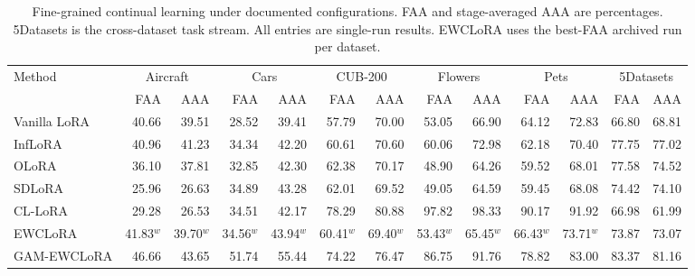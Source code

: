 \begin{table}[t]
\centering
\caption{Fine-grained continual learning under documented configurations. FAA and stage-averaged AAA are percentages. 5Datasets is the cross-dataset task stream. All entries are single-run results. EWCLoRA uses the best-FAA archived run per dataset.}
\label{tab:exp_fine}
\scriptsize\setlength{\tabcolsep}{2.2pt}\renewcommand{\arraystretch}{1.08}
\begin{tabular*}{\linewidth}{@{\extracolsep{\fill}}l*{12}{r}@{}}
\toprule
Method & \multicolumn{2}{c}{Aircraft} & \multicolumn{2}{c}{Cars} & \multicolumn{2}{c}{CUB-200} & \multicolumn{2}{c}{Flowers} & \multicolumn{2}{c}{Pets} & \multicolumn{2}{c}{5Datasets}\\
\cmidrule(lr){2-3}\cmidrule(lr){4-5}\cmidrule(lr){6-7}\cmidrule(lr){8-9}\cmidrule(lr){10-11}\cmidrule(lr){12-13}
 & FAA & AAA & FAA & AAA & FAA & AAA & FAA & AAA & FAA & AAA & FAA & AAA\\\midrule
Vanilla LoRA & 40.66 & 39.51 & 28.52 & 39.41 & 57.79 & 70.00 & 53.05 & 66.90 & 64.12 & 72.83 & 66.80 & 68.81\\
InfLoRA & 40.96 & 41.23 & 34.34 & 42.20 & 60.61 & 70.60 & 60.06 & 72.98 & 62.18 & 70.40 & 77.75 & 77.02\\
OLoRA & 36.10 & 37.81 & 32.85 & 42.30 & 62.38 & 70.17 & 48.90 & 64.26 & 59.52 & 68.01 & 77.58 & 74.52\\
SDLoRA & 25.96 & 26.63 & 34.89 & 43.28 & 62.01 & 69.52 & 49.05 & 64.59 & 59.45 & 68.08 & 74.42 & 74.10\\
CL-LoRA & 29.28 & 26.53 & 34.51 & 42.17 & 78.29 & 80.88 & 97.82 & 98.33 & 90.17 & 91.92 & 66.98 & 61.99\\
EWCLoRA & 41.83$^{w}$ & 39.70$^{w}$ & 34.56$^{w}$ & 43.94$^{w}$ & 60.41$^{w}$ & 69.40$^{w}$ & 53.43$^{w}$ & 65.45$^{w}$ & 66.43$^{w}$ & 73.71$^{w}$ & 73.87 & 73.07\\
GAM-EWCLoRA & 46.66 & 43.65 & 51.74 & 55.44 & 74.22 & 76.47 & 86.75 & 91.76 & 78.82 & 83.00 & 83.37 & 81.16\\
\bottomrule\end{tabular*}
\par\vspace{3pt}\begin{minipage}{\linewidth}\scriptsize

\end{minipage}
\end{table}
